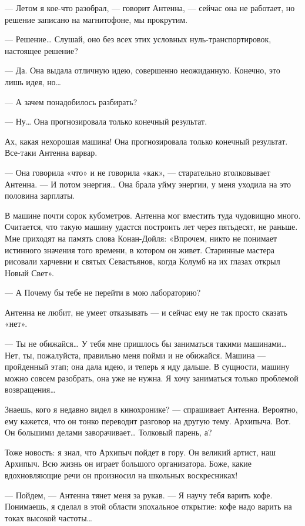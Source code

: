    — Летом я кое-что разобрал, —  говорит Антенна, — сейчас она не  работает,
   но решение записано на магнитофоне, мы прокрутим.

   — Решение…  Слушай,  оно  без  всех  этих  условных  нуль-транспортировок,
   настоящее решение?

   — Да. Она выдала отличную идею, совершенно неожиданную. Конечно, это  лишь
   идея, но…

   — А зачем понадобилось разбирать?

   — Ну… Она прогнозировала только конечный результат.

   Ах, какая нехорошая машина! Она прогнозировала только конечный  результат.
   Все-таки Антенна варвар.

   — Она  говорила «что»  и  не говорила  «как», —  старательно  втолковывает
   Антенна. — И потом энергия… Она брала уйму энергии, у меня уходила на  это
   половина зарплаты.

   В машине  почти  сорок кубометров.  Антенна  мог вместить  туда  чудовищно
   много. Считается, что такую машину удастся построить лет через  пятьдесят,
   не раньше. Мне приходят  на память слова  Конан-Дойля: «Впрочем, никто  не
   понимает истинного значения  того времени, в  котором он живет.  Старинные
   мастера рисовали харчевни и святых Севастьянов, когда Колумб на их  глазах
   открыл Новый Свет».

   — А Почему бы тебе не перейти в мою лабораторию?

   Антенна не любит, не умеет отказывать — и сейчас ему не так просто сказать
   «нет».

   — Ты не обижайся… У тебя мне пришлось бы заниматься такими машинами…  Нет,
   ты, пожалуйста, правильно меня  пойми и не  обижайся. Машина —  пройденный
   этап; она  дала идею,  и теперь  я иду  дальше. В  сущности, машину  можно
   совсем разобрать, она  уже не  нужна. Я хочу  заниматься только  проблемой
   возвращения…

   Знаешь,  кого  я  недавно  видел  в  кинохронике?  —  спрашивает  Антенна.
   Вероятно, ему кажется,  что он  тонко переводит разговор  на другую  тему.
   Архипыча. Вот. Он большими делами заворачивает… Толковый парень, а?

   Тоже новость: я знал,  что Архипыч пойдет в  гору. Он великий артист,  наш
   Архипыч.  Всю  жизнь   он  играет  большого   организатора.  Боже,   какие
   вдохновляющие речи он произносил на школьных воскресниках!

   — Пойдем, —  Антенна тянет  меня за  рукав. —  Я научу  тебя варить  кофе.
   Понимаешь, я сделал в этой  области эпохальное открытие: кофе надо  варить
   на токах высокой частоты…

